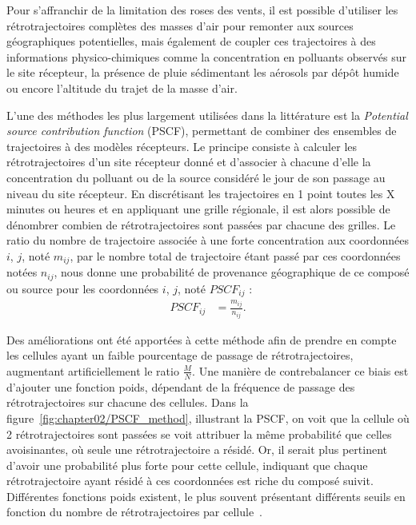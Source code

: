 Pour s'affranchir de la limitation des roses des vents, il est possible d'utiliser les
rétrotrajectoires complètes des masses d'air pour remonter aux sources géographiques
potentielles, mais également de coupler ces trajectoires à des informations
physico-chimiques comme la concentration en polluants observés sur le site récepteur, la
présence de pluie sédimentant les aérosols par dépôt humide ou encore l'altitude du trajet
de la masse d'air.

L'une des méthodes les plus largement utilisées dans la littérature est la \textit{Potential
source contribution function} (PSCF), permettant de combiner des ensembles de trajectoires à
des modèles récepteurs. Le principe consiste à calculer les rétrotrajectoires d'un site
récepteur donné et d'associer à chacune d'elle la concentration du polluant ou de la
source considéré le jour de son passage au niveau du site récepteur. En discrétisant les
trajectoires en 1 point toutes les X minutes ou heures et en appliquant une grille
régionale, il est alors possible de dénombrer combien de rétrotrajectoires sont passées par
chacune des grilles.  Le ratio du nombre de trajectoire associée à une forte concentration
aux coordonnées $i$, $j$, noté $m_{ij}$, par le nombre total de trajectoire étant passé
par ces coordonnées notées $n_{ij}$, nous donne une probabilité de provenance géographique
de ce composé ou source pour les coordonnées $i$, $j$, noté $PSCF_{ij}$ :
\begin{align}
    \label{eq:PSCF}
    PSCF_{ij} &= \frac{m_{ij}}{n_{ij}}.
\end{align}

Des améliorations ont été apportées à cette méthode afin de prendre en compte les cellules
ayant un faible pourcentage de passage de rétrotrajectoires, augmentant artificiellement
le ratio $\frac{M}{N}$. Une manière de contrebalancer ce biais est d'ajouter une fonction
poids, dépendant de la fréquence de passage des rétrotrajectoires sur chacune des
cellules. Dans la figure~\ref{fig:chapter02/PSCF_method}, illustrant la PSCF, on voit que
la cellule où 2 rétrotrajectoires sont passées se voit attribuer la même probabilité que
celles avoisinantes, où seule une rétrotrajectoire a résidé. Or, il serait plus pertinent
d'avoir une probabilité plus forte pour cette cellule, indiquant que chaque
rétrotrajectoire ayant résidé à ces coordonnées est riche du composé suivit.  Différentes
fonctions poids existent, le plus souvent présentant différents seuils en fonction du
nombre de rétrotrajectoires par cellule~\autocite{bressiSources2014,petitSources2019}.

